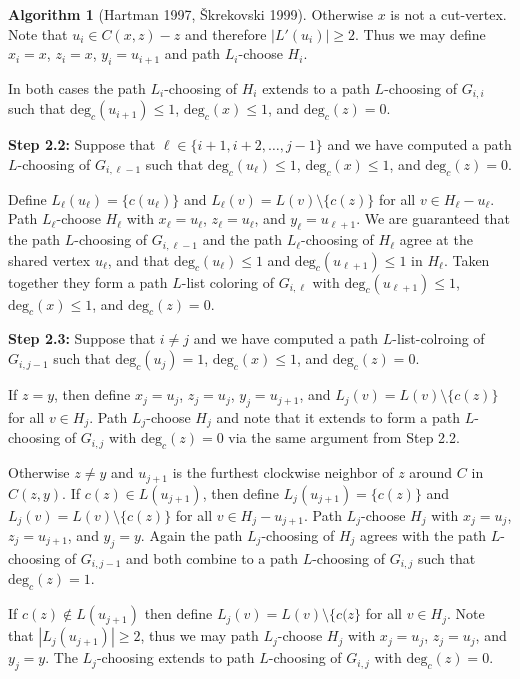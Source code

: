 \documentclass[12pt,letterpaper]{article}
\theoremstyle{plain}
\theoremstyle{definition}
\theoremstyle{break}
\newtheorem{algorithm}[lemma]{Algorithm}     %
\begin{document}
\begin{algorithm}[Hartman 1997, \v{S}krekovski 1999]
    Otherwise $x$ is not a cut-vertex. Note that $u_i\in C(x,z) - z$ and
    therefore $|L'(u_i)|\ge 2$. Thus we may define $x_i=x$, $z_i=x$,
    $y_i=u_{i+1}$ and path $L_i$-choose $H_i$.

    In both cases the path $L_i$-choosing of $H_i$ extends to a path
    $L$-choosing of $G_{i,i}$ such that $\text{deg}_c(u_{i+1})\le 1$,
    $\text{deg}_c(x)\le 1$, and $\text{deg}_c(z)=0$. 

    \textbf{Step 2.2:} Suppose that $\ell\in\{i+1, i+2,\ldots,j-1\}$
    and we have computed a path $L$-choosing of $G_{i,\ell-1}$ such that
    $\text{deg}_c(u_\ell)\le1$, $\text{deg}_c(x)\le 1$,
    and $\text{deg}_c(z)=0$.

    Define $L_\ell(u_\ell)=\{c(u_\ell)\}$ and
    $L_\ell(v)=L(v)\setminus\{c(z)\}$ for
    all $v\in H_\ell-u_\ell$.
    Path $L_\ell$-choose $H_\ell$ with
    $x_\ell=u_\ell$, $z_\ell=u_\ell$, and
    $y_\ell=u_{\ell+1}$. We are guaranteed that the path $L$-choosing
    of $G_{i,\ell-1}$ and the path $L_\ell$-choosing of $H_\ell$ agree
    at the shared vertex $u_\ell$, and that
    $\text{deg}_c(u_\ell)\le 1$ and $\text{deg}_c(u_{\ell+1})\le 1$
    in $H_\ell$. Taken together they form a
    path $L$-list coloring of $G_{i,\ell}$ with $\text{deg}_c(u_{\ell+1})\le 1$,
    $\text{deg}_c(x)\le 1$, and $\text{deg}_c(z)=0$.

    \textbf{Step 2.3:} Suppose that $i\ne j$ and we
    have computed a path $L$-list-colroing of $G_{i,j-1}$ such that
    $\text{deg}_c(u_j)=1$, $\text{deg}_c(x)\le 1$, and $\text{deg}_c(z)=0$. 

    If $z=y$, then
    define $x_j=u_j$, $z_j=u_j$, $y_j=u_{j+1}$, and
    $L_j(v)=L(v)\setminus\{c(z)\}$ for all $v\in H_j$. Path $L_j$-choose
    $H_j$ and note that it extends to form a path
    $L$-choosing of $G_{i,j}$ with
    $\text{deg}_c(z)=0$ via the same argument from Step 2.2.

    Otherwise $z\ne y$ and $u_{j+1}$ is the furthest clockwise neighbor of $z$
    around $C$ in $C(z,y)$. If $c(z)\in L(u_{j+1})$, then define
    $L_j(u_{j+1})=\{c(z)\}$ and $L_j(v)=L(v)\setminus\{c(z)\}$ for all $v\in
    H_j-u_{j+1}$. Path $L_j$-choose $H_j$ with $x_j=u_j$,
    $z_j=u_{j+1}$, and $y_j=y$. Again the path $L_j$-choosing of $H_j$
    agrees with the path $L$-choosing
    of $G_{i,j-1}$ and both combine to a path $L$-choosing
    of $G_{i,j}$ such that $\text{deg}_c(z)=1$.

    If $c(z)\not\in L(u_{j+1})$
    then define $L_j(v)=L(v)\setminus\{c(z\}$ for all $v\in H_j$. Note that
    $|L_j(u_{j+1})|\ge 2$, thus we may path $L_j$-choose $H_j$ with
    $x_j=u_j$, $z_j=u_j$, and $y_j=y$. The $L_j$-choosing extends to path
    $L$-choosing of $G_{i,j}$ with $\text{deg}_c(z)=0$.


\end{algorithm}
\end{document}
